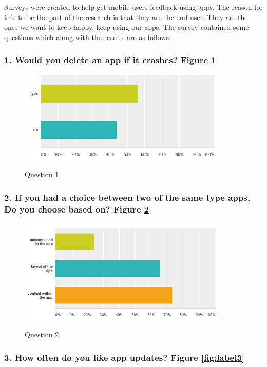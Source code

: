 Surveys were created to help get mobile users feedback using apps. The reason for this to be the part of the research is that they are the end-user. They are the ones we want to keep happy, keep using our apps. The survey contained some questions which along with the results are as follows:

\subsubsection{1. Would you delete an app if it crashes? Figure \ref{fig:label1}}

\begin{figure}[!h]
    \caption{Question 1}
    \centering
    \includegraphics[width=100mm]{images/survey/crashes}
    \label{fig:label1}
\end{figure}

\subsubsection{2. If you had a choice between two of the same type apps, Do you choose based on?  Figure \ref{fig:label2}}

\begin{figure}[!h]
    \caption{Question 2}
    \centering
    \includegraphics[width=100mm]{images/survey/choose}
    \label{fig:label2}
\end{figure}

\subsubsection{3. How often do you like app updates? Figure \ref{fig:label3}}

